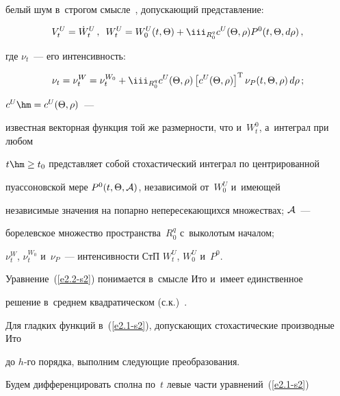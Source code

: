 белый шум в~строгом смысле~\cite{1-s2, 2-s2}, допускающий представление:

       \begin{equation}

       V_t^U = \dot W_t^U\,, \enskip 

       W_t^U = W_0^U (t,\Theta) + \iii_{R_0^q} c^U (\Theta,\rho) P^0 

       ( t,\Theta, d\rho)\,,\label{e2.3-s2}

       \end{equation}

где $\nu_t$~--- его интенсивность:



\noindent

    \begin{equation}

    \nu_t=\nu_t^W =\nu_t^{W_0} +  \iii_{R_0^q} c^U (\Theta,\rho) 

    \left[c^U (\Theta,\rho)\right]^{\mathrm{T}} \nu_P (t,\Theta,\rho) \,d\rho\,;

    \label{e2.4-s2}

    \end{equation}

 $c^U \hm= c^U(\Theta,\rho)$~--- 

известная векторная функция той же размерности, что и~$W_t^0$, а~интеграл при любом

 $t\hm\ge t_0$ представляет собой стохастический интеграл по центрированной 

 пуассоновской мере $P^0(t,\Theta,{\cal A})$, независимой от~$W_0^U$ и~имеющей 

 независимые значения на попарно непересекающихся множествах; ${\cal A}$~--- 

 борелевское множество пространства~$R_0^q$ с~выколотым началом; 

 $\nu_t^W$, $\nu_t^{W_0}$ и~$\nu_P$~--- интенсивности СтП $W_t^U$, $W_{0}^U$ и~$P^0$. 

 Уравнение~(\ref{e2.2-s2}) понимается в~смысле Ито и~имеет единственное 

 решение в~среднем квадратическом (с.к.)~\cite{1-s2, 2-s2}.





Для гладких функций в~(\ref{e2.1-s2}), допускающих стохастические производные Ито 

до $h$-го порядка, выполним  следующие преобразования.

Будем дифференцировать сполна по~$t$ левые части уравнений~(\ref{e2.1-s2}) 

